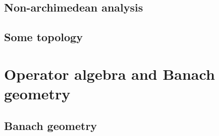         \begin{appendices}
            \chapter{Non-archimedean analysis}
                \begin{abstract}
                    
                \end{abstract}
                
                \minitoc
        
            \chapter{Some topology}
                \begin{abstract}
                    
                \end{abstract}
                
                \minitoc
                
                
                
                
        \end{appendices}

    \part{Operator algebra and Banach geometry}
        \chapter{Banach geometry}
            \begin{abstract}
                
            \end{abstract}
            
            \minitoc
            
            
            
            
            
            
        
